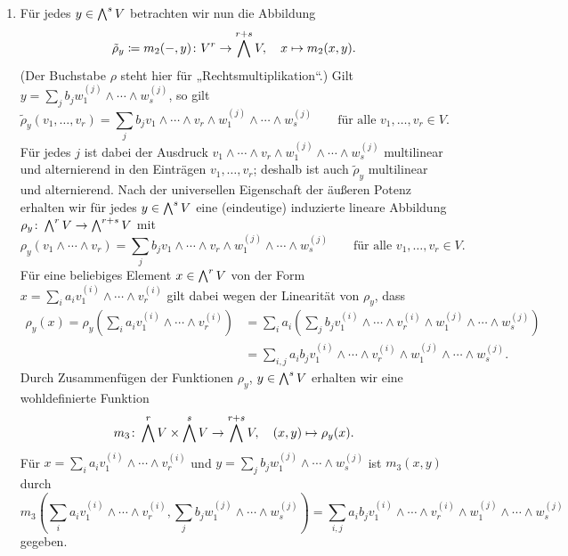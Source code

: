 \begin{enumerate}
  \item
    Für jedes $y \in \bigwedge^{s} V$ betrachten wir nun die Abbildung
    \[
                \tilde{\rho}_y
      \coloneqq m_2(-, y)
      \colon    V^r
      \to       \bigwedge^{r+s} V,
      \quad     x
      \mapsto   m_2(x,y).
    \]
    (Der Buchstabe $\rho$ steht hier für „Rechtsmultiplikation“.)
    Gilt $y = \sum_j b_j w^{(j)}_1 \wedge \dotsb \wedge w^{(j)}_s$, so gilt
    \[
        \tilde{\rho}_y(v_1, \dotsc, v_r)
      = \sum_j b_j v_1 \wedge \dotsb \wedge v_r \wedge w^{(j)}_1 \wedge \dotsb \wedge w^{(j)}_s
      \qquad
      \text{für alle $v_1, \dotsc, v_r \in V$}.
    \]
    Für jedes $j$ ist dabei der Ausdruck $v_1 \wedge \dotsb \wedge v_r \wedge w^{(j)}_1 \wedge \dotsb \wedge w^{(j)}_s$ multilinear und alternierend in den Einträgen $v_1, \dotsc, v_r$;
    deshalb ist auch $\tilde{\rho}_y$ multilinear und alternierend.
    Nach der universellen Eigenschaft der äußeren Potenz erhalten wir für jedes $y \in \bigwedge^{s} V$ eine (eindeutige) induzierte lineare Abbildung $\rho_y \colon \bigwedge^{r} V \to \bigwedge^{r+s} V$ mit
    \[
        \rho_y(v_1 \wedge \dotsb \wedge v_r)
      = \sum_j b_j v_1 \wedge \dotsb \wedge v_r \wedge w^{(j)}_1 \wedge \dotsb \wedge w^{(j)}_s
      \qquad
      \text{für alle $v_1, \dotsc, v_r \in V$}.
    \]
    Für eine beliebiges Element $x \in \bigwedge^{r} V$ von der Form $x = \sum_i a_i v^{(i)}_1 \wedge \dotsb \wedge v^{(i)}_r$ gilt dabei wegen der Linearität von $\rho_y$, dass
    \begin{align*}
          \rho_y(x)
      =   \rho_y\left( \sum_i a_i v^{(i)}_1 \wedge \dotsb \wedge v^{(i)}_r \right)
      &=  \sum_i a_i \left(
                       \sum_j b_j v^{(i)}_1 \wedge \dotsb \wedge v^{(i)}_r \wedge w^{(j)}_1 \wedge \dotsb \wedge w^{(j)}_s
                     \right)
      \\
      &=  \sum_{i,j} a_i b_j v^{(i)}_1 \wedge \dotsb \wedge v^{(i)}_r \wedge w^{(j)}_1 \wedge \dotsb \wedge w^{(j)}_s.
    \end{align*}
    Durch Zusammenfügen der Funktionen $\rho_y$, $y \in \bigwedge^{s} V$ erhalten wir eine wohldefinierte Funktion
    \[
              m_3
      \colon  \bigwedge^{r} V \times \bigwedge^{s} V
      \to     \bigwedge^{r+s} V,
      \quad   (x,y)
      \mapsto \rho_y(x).
    \]
    Für $x = \sum_i a_i v^{(i)}_1 \wedge \dotsb \wedge v^{(i)}_r$ und $y = \sum_j b_j w^{(j)}_1 \wedge \dotsb \wedge w^{(j)}_s$ ist $m_3(x,y)$ durch
    \[
        m_3\left( \sum_i a_i v^{(i)}_1 \wedge \dotsb \wedge v^{(i)}_r, \sum_j b_j w^{(j)}_1 \wedge \dotsb \wedge w^{(j)}_s \right)
      = \sum_{i,j} a_i b_j v^{(i)}_1 \wedge \dotsb \wedge v^{(i)}_r \wedge w^{(j)}_1 \wedge \dotsb \wedge w^{(j)}_s
    \]
    gegeben.
\end{enumerate}

